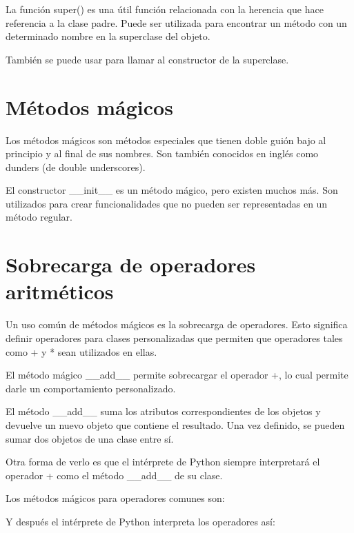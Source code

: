 \documentclass{report}
\begin{document}
La función super() es una útil función relacionada con la herencia que hace referencia a la clase padre. Puede ser utilizada para encontrar un método con un determinado nombre en la superclase del objeto.


También se puede usar para llamar al constructor de la superclase.


\section{Métodos mágicos}

Los métodos mágicos son métodos especiales que tienen doble guión bajo al principio y al final de sus nombres. Son también conocidos en inglés como dunders (de double underscores).

El constructor \_\_init\_\_ es un método mágico, pero existen muchos más. Son utilizados para crear funcionalidades que no pueden ser representadas en un método regular.

\section{Sobrecarga de operadores aritméticos}

Un uso común de métodos mágicos es la sobrecarga de operadores. Esto significa definir operadores para clases personalizadas que permiten que operadores tales como + y * sean utilizados en ellas.

El método mágico \_\_add\_\_ permite sobrecargar el operador +, lo cual permite darle un comportamiento personalizado.


El método \_\_add\_\_ suma los atributos correspondientes de los objetos y devuelve un nuevo objeto que contiene el resultado. Una vez definido, se pueden sumar dos objetos de una clase entre sí.

Otra forma de verlo es que el intérprete de Python siempre interpretará el operador + como el método \_\_add\_\_ de su clase.

Los métodos mágicos para operadores comunes son:


Y después el intérprete de Python interpreta los operadores así:
\end{document}

